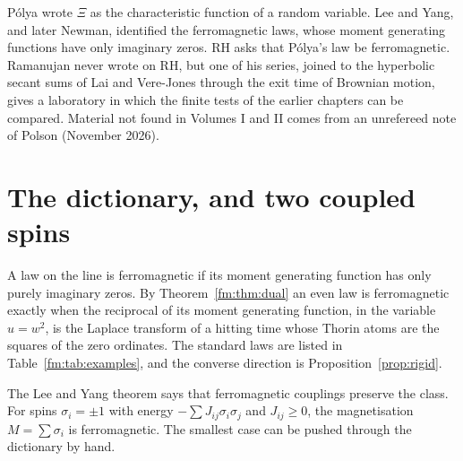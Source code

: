 \label{f:ch:ferro}\label{r:ch:ramanujan}

P\'olya wrote $\Xi$ as the characteristic function of a random variable. Lee and Yang, and later Newman, identified the ferromagnetic laws, whose moment generating functions have only imaginary zeros. RH asks that P\'olya's law be ferromagnetic. Ramanujan never wrote on RH, but one of his series, joined to the hyperbolic secant sums of Lai and Vere-Jones through the exit time of Brownian motion, gives a laboratory in which the finite tests of the earlier chapters can be compared. Material not found in Volumes I and II comes from an unrefereed note of Polson (November 2026).

\section{The dictionary, and two coupled spins}\label{f:sec:ly}

A law on the line is ferromagnetic if its moment generating function has only purely imaginary zeros. By Theorem~\ref{fm:thm:dual} an even law is ferromagnetic exactly when the reciprocal of its moment generating function, in the variable $u=w^2$, is the Laplace transform of a hitting time whose Thorin atoms are the squares of the zero ordinates. The standard laws are listed in Table~\ref{fm:tab:examples}, and the converse direction is Proposition~\ref{prop:rigid}.

The Lee and Yang theorem says that ferromagnetic couplings preserve the class. For spins $\sigma_i=\pm1$ with energy $-\sum J_{ij}\sigma_i\sigma_j$ and $J_{ij}\ge0$, the magnetisation $M=\sum\sigma_i$ is ferromagnetic. The smallest case can be pushed through the dictionary by hand.

